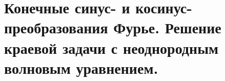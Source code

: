 \section{Конечные синус- и косинус-преобразования Фурье. Решение краевой задачи
с неоднородным волновым уравнением.}

\newpage
